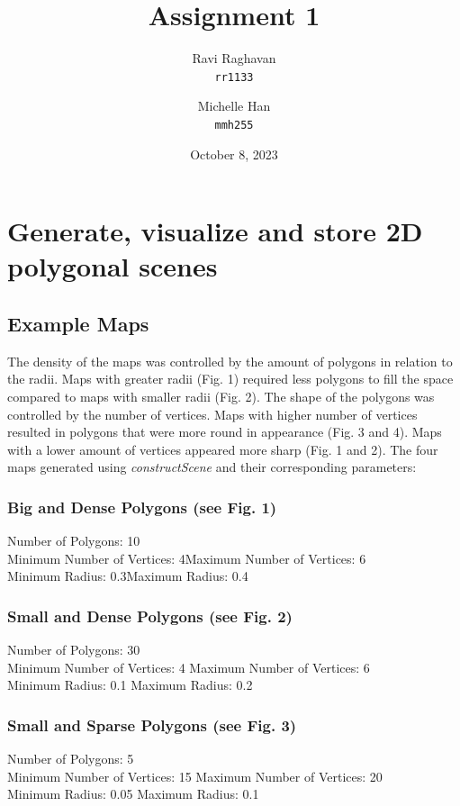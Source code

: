\documentclass{article}
\title{Assignment 1}
\date{October 8, 2023}
\author{
  Ravi Raghavan\\
  \texttt{rr1133}
  \and
  Michelle Han\\
  \texttt{mmh255}
}
\begin{document}
\maketitle
\section{Generate, visualize and store 2D polygonal scenes}

\subsection{Example Maps}
The density of the maps was controlled by the amount of polygons in relation to the radii. Maps with greater radii (Fig. 1) required less polygons to fill the space compared to maps with smaller radii (Fig. 2). The shape of the polygons was controlled by the number of vertices. Maps with higher number of vertices resulted in polygons that were more round in appearance (Fig. 3 and 4). Maps with a lower amount of vertices appeared more sharp (Fig. 1 and 2). The four maps generated using \textit{constructScene} and their corresponding parameters:
\subsubsection{Big and Dense Polygons (see Fig. 1)}
Number of Polygons: 10
\\Minimum Number of Vertices: 4\space\space\space\space\space\space Maximum Number of Vertices: 6
\\Minimum Radius: 0.3\space\space\space\space\space\space\space\space\space\space\space \space\space\space\space\space\space \space\space\space Maximum Radius: 0.4
\subsubsection{Small and Dense Polygons (see Fig. 2)}
Number of Polygons: 30 
\\Minimum Number of Vertices: 4 \space\space\space\space\space\space Maximum Number of Vertices: 6
\\Minimum Radius: 0.1 \space\space\space\space\space\space\space\space\space\space\space \space\space\space\space\space\space \space\space\space Maximum Radius: 0.2
\subsubsection{Small and Sparse Polygons (see Fig. 3)}
Number of Polygons: 5
\\Minimum Number of Vertices: 15 \space\space\space\space\space\space Maximum Number of Vertices: 20
\\Minimum Radius: 0.05 \space\space\space\space\space\space\space\space\space\space\space \space\space\space\space\space\space \space\space\space Maximum Radius: 0.1
\end{document}

